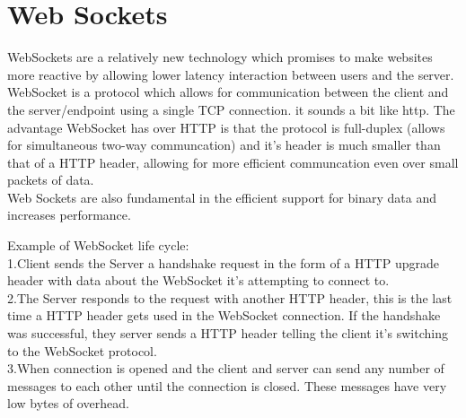\section{Web Sockets}
\label{section:websockets}

WebSockets\citep{Ontology:matching} are a relatively new technology which promises to make websites more reactive by allowing lower latency
interaction between users and the server.\\

WebSocket is a protocol which allows for communication between the client and the server/endpoint using a single TCP
connection. it sounds a bit like http. The advantage WebSocket has over HTTP is that the protocol is full-duplex
(allows for simultaneous two-way communcation) and it’s header is much smaller than that of a HTTP header, allowing for
more efficient communcation even over small packets of data.\\

Web Sockets are also fundamental in the efficient support for binary data and increases performance.

Example of WebSocket life cycle:\citep{thesis:state7}\\
1.Client sends the Server a handshake request in the form of a HTTP upgrade header with data about the WebSocket
it’s attempting to connect to.\\
2.The Server responds to the request with another HTTP header, this is the last time a HTTP header gets used in the
WebSocket connection. If the handshake was successful, they server sends a HTTP header telling the client it’s
switching to the WebSocket protocol.\\
3.When connection is opened and the client and server can send any number of messages to each other
until the connection is closed. These messages have very low bytes of overhead.\\
